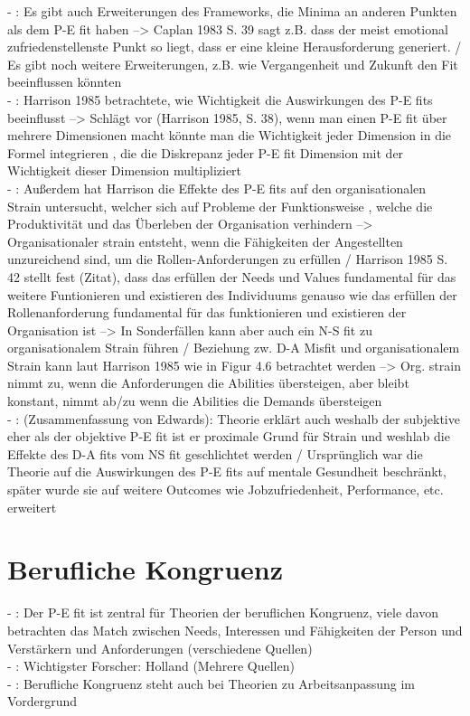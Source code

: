 - \cite[S. 23]{edwards:2008}: Es gibt auch Erweiterungen des Frameworks, die Minima an anderen Punkten als dem P-E fit haben --> Caplan 1983 S. 39 sagt z.B. dass der meist emotional zufriedenstellenste Punkt so liegt, dass er eine kleine Herausforderung generiert. / Es gibt noch weitere Erweiterungen, z.B. wie Vergangenheit und Zukunft den Fit beeinflussen könnten \\
- \cite[S. 23f.]{edwards:2008}: Harrison 1985 betrachtete, wie Wichtigkeit die Auswirkungen des P-E fits beeinflusst --> Schlägt vor (Harrison 1985, S. 38), wenn man einen P-E fit über mehrere Dimensionen macht könnte man die Wichtigkeit jeder Dimension in die Formel integrieren , die die Diskrepanz jeder P-E fit Dimension mit der Wichtigkeit dieser Dimension multipliziert \\
- \cite[S. 24]{edwards:2008}: Außerdem hat Harrison die Effekte des P-E fits auf den organisationalen Strain untersucht, welcher sich auf Probleme der Funktionsweise , welche die Produktivität und das Überleben der Organisation verhindern --> Organisationaler strain entsteht, wenn die Fähigkeiten der Angestellten unzureichend sind, um die Rollen-Anforderungen zu erfüllen / Harrison 1985 S. 42 stellt fest (Zitat), dass das erfüllen der Needs und Values fundamental für das weitere Funtionieren und existieren des Individuums genauso wie das erfüllen der Rollenanforderung fundamental für das funktionieren und existieren der Organisation ist --> In Sonderfällen kann aber auch ein N-S fit zu organisationalem Strain führen / Beziehung zw. D-A Misfit und organisationalem Strain kann laut Harrison 1985 wie in Figur 4.6 betrachtet werden --> Org. strain nimmt zu, wenn die Anforderungen die Abilities übersteigen, aber bleibt konstant, nimmt ab/zu wenn die Abilities die Demands übersteigen \\
- \cite[S. 24]{edwards:2008}: (Zusammenfassung von Edwards): Theorie erklärt auch weshalb der subjektive eher als der objektive P-E fit ist er proximale Grund für Strain und weshlab die Effekte des D-A fits vom NS fit geschlichtet werden / Ursprünglich war die Theorie auf die Auswirkungen des P-E fits auf mentale Gesundheit beschränkt, später wurde sie auf weitere Outcomes wie Jobzufriedenheit, Performance, etc. erweitert

\section{Berufliche Kongruenz}
\label{ch:notizen:beruflicheKongruenz}
- \cite[S. 25]{edwards:2008}: Der P-E fit ist zentral für Theorien der beruflichen Kongruenz, viele davon betrachten das Match zwischen Needs, Interessen und Fähigkeiten der Person und Verstärkern und Anforderungen (verschiedene Quellen) \\
- \cite[S. 26]{edwards:2008}: Wichtigster Forscher: Holland (Mehrere Quellen) \\
- \cite[S. 26]{edwards:2008}: Berufliche Kongruenz steht auch bei Theorien zu Arbeitsanpassung im Vordergrund

